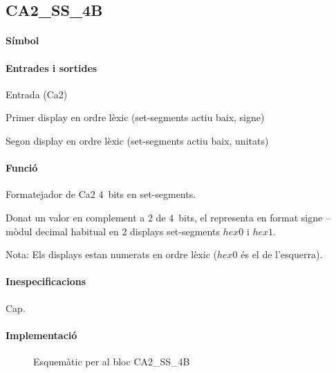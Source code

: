 \subsection{\label{sub:\projectname-CA2_SS_4B} \textsf{CA2\_SS\_4B}}

\paragraph{Símbol}
\begin{center}  \end{center}

\paragraph{Entrades i sortides}

\begin{where}
\item[\nodenamerange{x}{3}{0}] Entrada (Ca2)
\item[\nodenamerange{hex0}{6}{0}] Primer display en ordre lèxic (set-segments actiu baix, signe)
\item[\nodenamerange{hex1}{6}{0}] Segon display en ordre lèxic (set-segments actiu baix, unitats)
\end{where}

\paragraph{Funció}

Formatejador de Ca2 4~bits en set-segments.

Donat un valor en complement a 2 de 4~bits, el representa en format signe --
mòdul decimal habitual en 2 displays set-segments $hex0$ i $hex1$.

Nota: Els displays estan numerats en ordre lèxic ($hex0$ és el de l'esquerra).

\paragraph{Inespecificacions}

Cap.

\paragraph{Implementació}

\begin{figure}[b]
  \begin{center}
  \end{center}
  \caption{\label{fig:\projectname-CA2_SS_4B} Esquemàtic per al bloc \textsf{CA2\_SS\_4B}}
\end{figure}

